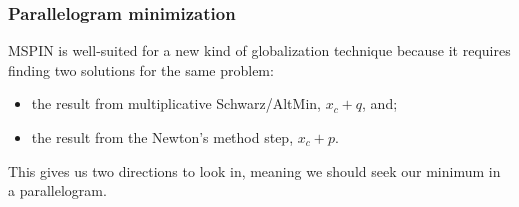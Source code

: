 \documentclass[10pt]{beamer}
\begin{document}
\begin{frame}
\frametitle{Parallelogram minimization}

MSPIN is well-suited for a new kind of globalization technique because it requires finding two solutions for the same problem:
\begin{itemize}
\item the result from multiplicative Schwarz/AltMin, $x_c + q$, and;
\item the result from the Newton's method step, $x_c + p$.
\end{itemize}
This gives us two directions to look in, meaning we should seek our minimum in a parallelogram.

\centering
{}

\end{frame}
\end{document}

